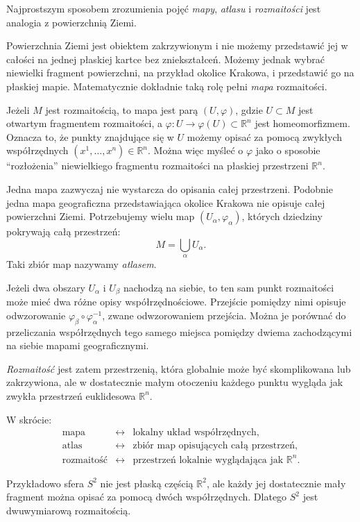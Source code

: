 \begin{uwaga}
Najprostszym sposobem zrozumienia pojęć \emph{mapy}, \emph{atlasu} i
\emph{rozmaitości} jest analogia z powierzchnią Ziemi.

Powierzchnia Ziemi jest obiektem zakrzywionym i nie możemy przedstawić jej
w całości na jednej płaskiej kartce bez zniekształceń. Możemy jednak wybrać
niewielki fragment powierzchni, na przykład okolice Krakowa, i przedstawić go
na płaskiej mapie. Matematycznie dokładnie taką rolę pełni \emph{mapa}
rozmaitości.

Jeżeli $M$ jest rozmaitością, to mapa jest parą $(U,\varphi)$, gdzie
$U\subset M$ jest otwartym fragmentem rozmaitości, a $\varphi\colon U\longrightarrow \varphi(U)\subset\mathbb{R}^n$
jest homeomorfizmem. Oznacza to, że punkty znajdujące się w $U$ możemy opisać
za pomocą zwykłych współrzędnych $(x^1,\ldots,x^n)\in\mathbb{R}^n$.
Można więc myśleć o $\varphi$ jako o sposobie ``rozłożenia'' niewielkiego
fragmentu rozmaitości na płaskiej przestrzeni $\mathbb{R}^n$.

Jedna mapa zazwyczaj nie wystarcza do opisania całej przestrzeni. Podobnie
jedna mapa geograficzna przedstawiająca okolice Krakowa nie opisuje całej
powierzchni Ziemi. Potrzebujemy wielu map $(U_\alpha,\varphi_\alpha)$,
których dziedziny pokrywają całą przestrzeń:
\[
    M=\bigcup_{\alpha}U_\alpha.
\]
Taki zbiór map nazywamy \emph{atlasem}.

Jeżeli dwa obszary $U_\alpha$ i $U_\beta$ nachodzą na siebie, to ten sam punkt
rozmaitości może mieć dwa różne opisy współrzędnościowe. Przejście pomiędzy
nimi opisuje odwzorowanie $\varphi_\beta\circ\varphi_\alpha^{-1}$,
zwane odwzorowaniem przejścia. Można je porównać do przeliczania współrzędnych
tego samego miejsca pomiędzy dwiema zachodzącymi na siebie mapami
geograficznymi.

\emph{Rozmaitość} jest zatem przestrzenią, która globalnie może być
skomplikowana lub zakrzywiona, ale w dostatecznie małym otoczeniu każdego
punktu wygląda jak zwykła przestrzeń euklidesowa $\mathbb{R}^n$.

W skrócie:
\[
\boxed{
\begin{array}{ccl}
\text{mapa}      &\longleftrightarrow& \text{lokalny układ współrzędnych},\\[2mm]
\text{atlas}     &\longleftrightarrow& \text{zbiór map opisujących całą przestrzeń},\\[2mm]
\text{rozmaitość}&\longleftrightarrow& \text{przestrzeń lokalnie wyglądająca jak }\mathbb{R}^n.
\end{array}}
\]

Przykładowo sfera $S^2$ nie jest płaską częścią $\mathbb{R}^2$, ale każdy jej
dostatecznie mały fragment można opisać za pomocą dwóch współrzędnych.
Dlatego $S^2$ jest dwuwymiarową rozmaitością.
\end{uwaga}

